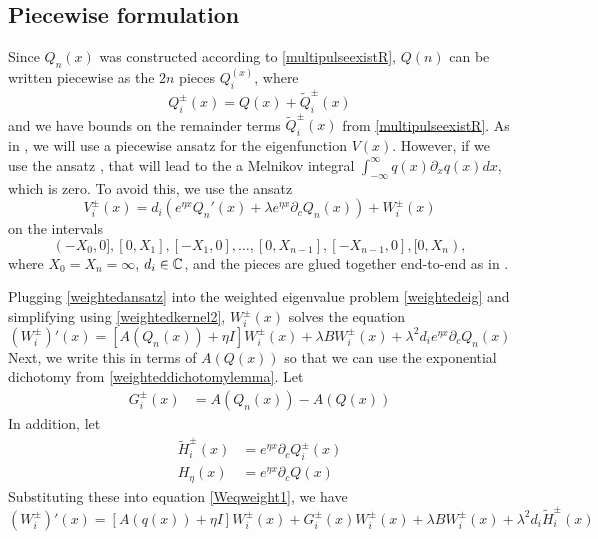 \documentclass[thesis.tex]{subfiles}
\begin{document}
\subsection{Piecewise formulation}\label{sec:kdvRpiecewise}

Since $Q_n(x)$ was constructed according to \cref{multipulseexistR}, $Q(n)$ can be written piecewise as the $2n$ pieces $Q_i^(x)$, where
\[
Q_i^\pm(x) = Q(x) + \tilde{Q}_i^\pm(x)
\]
and we have bounds on the remainder terms $\tilde{Q}_i^\pm(x)$ from \cref{multipulseexistR}. As in \cite{Sandstede1998}, we will use a piecewise ansatz for the eigenfunction $V(x)$. However, if we use the ansatz \cite[(3.5)]{Sandstede1998}, that will lead to the a Melnikov integral $\int_{-\infty}^\infty q(x)\partial_x q(x) dx$, which is zero. To avoid this, we use the ansatz
\begin{equation}\label{weightedansatz}
V_i^\pm(x) = d_i (e^{\eta x} Q_n'(x) + \lambda e^{\eta x} \partial_c Q_n(x)) + W_i^\pm(x)
\end{equation}
on the intervals 
\[
(-X_0, 0], [0, X_1], [-X_1, 0], \dots, [0, X_{n-1}], [-X_{n-1}, 0], [0, X_n),
\]
where $X_0 = X_n = \infty$, $d_i \in \mathbb{C}$, and the pieces are glued together end-to-end as in \cite{Sandstede1998}.

Plugging \cref{weightedansatz} into the weighted eigenvalue problem \cref{weightedeig} and simplifying using \cref{weightedkernel2}, $W_i^\pm(x)$ solves the equation
\begin{equation}\label{Weqweight1}
(W_i^\pm)'(x) = [A(Q_n(x)) + \eta I] W_i^\pm(x) + \lambda B W_i^\pm(x) + \lambda^2 d_i e^{\eta x} \partial_c Q_n(x)
\end{equation}
Next, we write this in terms of $A(Q(x))$ so that we can use the exponential dichotomy from \cref{weighteddichotomylemma}. Let
\begin{align*}
G_i^\pm(x) &= A(Q_n(x)) - A(Q(x))
\end{align*}
In addition, let
\begin{align*}
\tilde{H}_i^\pm(x) &= e^{\eta x} \partial_c Q_i^\pm(x) \\
H_\eta(x) &= e^{\eta x} \partial_c Q(x)
\end{align*}
Substituting these into equation \cref{Weqweight1}, we have
\begin{equation}\label{Weqweight2}
(W_i^\pm)'(x) = [A(q(x)) + \eta I] W_i^\pm(x)+ G_i^\pm(x)W_i^\pm(x) + \lambda B W_i^\pm(x) + \lambda^2 d_i \tilde{H}_i^\pm(x)
\end{equation}
\end{document}
